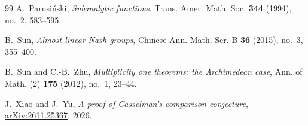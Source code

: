 \documentclass[a4paper,12pt]{amsart}
\numberwithin{equation}{section}
\theoremstyle{definition}
\theoremstyle{remark}
\begin{document}
\begin{thebibliography}{99}
A.~Parusi\'nski,
\emph{Subanalytic functions},
Trans. Amer. Math. Soc. \textbf{344} (1994), no.~2, 583--595.

B.~Sun,
\emph{Almost linear Nash groups},
Chinese Ann. Math. Ser. B \textbf{36} (2015), no.~3, 355--400.

B.~Sun and C.-B.~Zhu,
\emph{Multiplicity one theorems: the Archimedean case},
Ann. of Math. (2) \textbf{175} (2012), no.~1, 23--44.

J.~Xiao and J.~Yu,
\emph{A proof of Casselman's comparison conjecture},
\href{https://arxiv.org/abs/2611.25367}{arXiv:2611.25367}, 2026.

\end{thebibliography}
\end{document}
